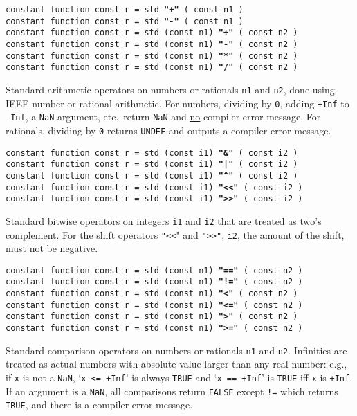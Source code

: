 \documentclass[12pt]{article}
\newcommand{\ttkey}[1]{{\tt \bfseries #1}}
\newenvironment{indpar}[1][0.3in]%
	{\begin{list}{}%
		     {\setlength{\itemsep}{0in}%
		      \setlength{\topsep}{0in}%
		      \setlength{\parsep}{1ex}%
		      \setlength{\labelwidth}{#1}%
		      \setlength{\leftmargin}{#1}%
		      \addtolength{\leftmargin}{\labelsep}}%
	 \item}%
	{\end{list}}
\begin{document}
{\tt constant function const r = std \ttkey{"+"} ( const n1 )} \\
{\tt constant function const r = std \ttkey{"-"} ( const n1 )} \\
{\tt constant function const r = std (const n1) \ttkey{"+"} ( const n2 )} \\
{\tt constant function const r = std (const n1) \ttkey{"-"} ( const n2 )} \\
{\tt constant function const r = std (const n1) \ttkey{"*"} ( const n2 )} \\
{\tt constant function const r = std (const n1) \ttkey{"/"} ( const n2 )}
\begin{indpar}
Standard arithmetic operators on numbers or rationals {\tt n1} and {\tt n2},
done using IEEE number or rational arithmetic.
For numbers, dividing by {\tt 0},
adding {\tt +Inf} to {\tt -Inf}, a {\tt NaN} argument, etc.~return
{\tt NaN} and \underline{no} compiler error message.
For rationals, dividing by {\tt 0} returns {\tt UNDEF} and outputs a
compiler error message.
\end{indpar}

{\tt constant function const r = std (const i1) \ttkey{"\&"} ( const i2 )} \\
{\tt constant function const r = std (const i1) \ttkey{"|"} ( const i2 )} \\
{\tt constant function const r = std (const i1) \ttkey{"\textasciicircum"}
                            ( const i2 )} \\
{\tt constant function const r = std (const i1) \ttkey{"<{}<"} ( const i2 )} \\
{\tt constant function const r = std (const i1) \ttkey{">{}>"} ( const i2 )}
\begin{indpar}
Standard bitwise operators on integers {\tt i1} and {\tt i2}
that are treated as two's complement.  For the shift operators
{\tt "<{}<}" and {\tt ">{}>"}, {\tt i2}, the amount of the shift,
must not be negative.
\end{indpar}

{\tt constant function const r = std (const n1) \ttkey{"=="} ( const n2 )} \\
{\tt constant function const r = std (const n1) \ttkey{"!="} ( const n2 )} \\
{\tt constant function const r = std (const n1) \ttkey{"<"} ( const n2 )} \\
{\tt constant function const r = std (const n1) \ttkey{"<="} ( const n2 )} \\
{\tt constant function const r = std (const n1) \ttkey{">"} ( const n2 )} \\
{\tt constant function const r = std (const n1) \ttkey{">="} ( const n2 )}
\begin{indpar}
Standard comparison operators on numbers or rationals {\tt n1} and {\tt n2}.
Infinities are treated as actual numbers with absolute value
larger than any real number: e.g., if {\tt x} is not a {\tt NaN},
`{\tt x <= +Inf}' is always
{\tt TRUE} and `{\tt x == +Inf}' is {\tt TRUE} iff {\tt x} is {\tt +Inf}.
If an argument is a {\tt NaN}, all comparisons return {\tt FALSE}
except {\tt !=} which returns {\tt TRUE}, and there is a compiler
error message.
\end{indpar}
\end{document}
